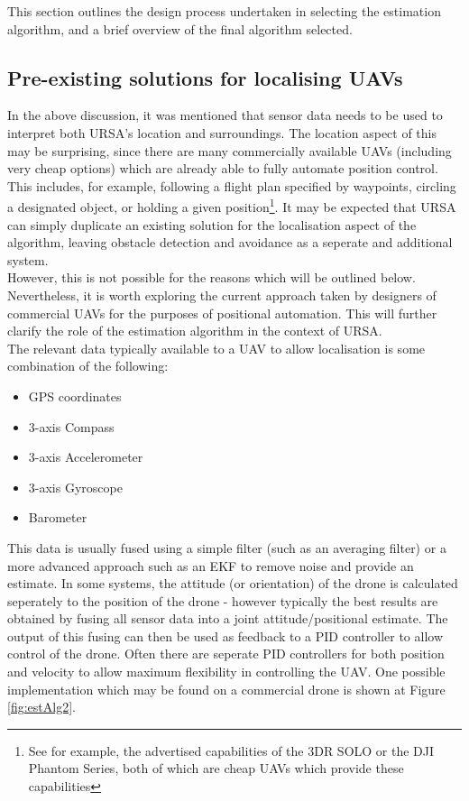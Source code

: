 \documentclass[capstone_report.tex]{subfiles}
\begin{document}
    This section outlines the design process undertaken in selecting the estimation algorithm, and a brief overview of the final algorithm selected. 

    \subsection{Pre-existing solutions for localising UAVs}
    In the above discussion, it was mentioned that sensor data needs to be used to interpret both URSA's location and surroundings. The location aspect of this may be surprising, since there are many commercially available UAVs (including very cheap options) which are already able to fully automate position control. This includes, for example, following a flight plan specified by waypoints, circling a designated object, or holding a given position\footnote{See for example, the advertised capabilities of the 3DR SOLO or the DJI Phantom Series, both of which are cheap UAVs which provide these capabilities}. It may be expected that URSA can simply duplicate an existing solution for the localisation aspect of the algorithm, leaving obstacle detection and avoidance as a seperate and additional system.\\

    However, this is not possible for the reasons which will be outlined below. Nevertheless, it is worth exploring the current approach taken by designers of commercial UAVs for the purposes of positional automation. This will further clarify the role of the estimation algorithm in the context of URSA.\\

    The relevant data typically available to a UAV to allow localisation is some combination of the following:
    \begin{itemize}
    	\item GPS coordinates
    	\item 3-axis Compass
    	\item 3-axis Accelerometer
    	\item 3-axis Gyroscope
    	\item Barometer
    \end{itemize}

    This data is usually fused using a simple filter (such as an averaging filter) or a more advanced approach such as an EKF to remove noise and provide an estimate. In some systems, the attitude (or orientation) of the drone is calculated seperately to the position of the drone - however typically the best results are obtained by fusing all sensor data into a joint attitude/positional estimate. The output of this fusing can then be used as feedback to a PID controller to allow control of the drone. Often there are seperate PID controllers for both position and velocity to allow maximum flexibility in controlling the UAV. One possible implementation which may be found on a commercial drone is shown at Figure \ref{fig:estAlg2}. \\
\end{document}
